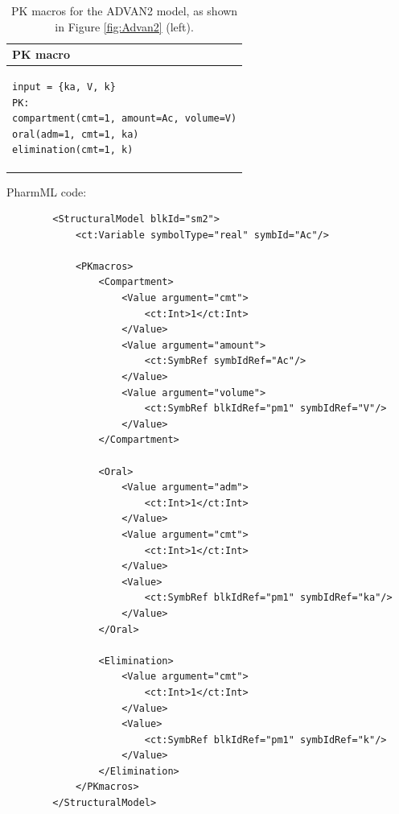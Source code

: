 \begin{table}[h!]
\setlength{\tabcolsep}{15pt}
\begin{center}
\begin{tabular}{l}
  \hline \hline
PK macro  \\[-.25ex]
  \hline
\lstset{language=NONMEMdataSet}
\begin{lstlisting}
input = {ka, V, k}
PK:
compartment(cmt=1, amount=Ac, volume=V)
oral(adm=1, cmt=1, ka)
elimination(cmt=1, k)
\end{lstlisting}
\\
  \hline
\end{tabular}
\caption{PK macros  for the ADVAN2 model, as shown in Figure \ref{fig:Advan2} (left).}
\label{tab:advan2Table}
\end{center}
\end{table}

PharmML code:
\lstset{language=XML}
\begin{lstlisting}
        <StructuralModel blkId="sm2">
            <ct:Variable symbolType="real" symbId="Ac"/>
            
            <PKmacros>
                <Compartment>
                    <Value argument="cmt">
                        <ct:Int>1</ct:Int>
                    </Value>
                    <Value argument="amount">
                        <ct:SymbRef symbIdRef="Ac"/>
                    </Value>
                    <Value argument="volume">
                        <ct:SymbRef blkIdRef="pm1" symbIdRef="V"/>
                    </Value>
                </Compartment>
                
                <Oral>
                    <Value argument="adm">
                        <ct:Int>1</ct:Int>
                    </Value>
                    <Value argument="cmt">
                        <ct:Int>1</ct:Int>
                    </Value>
                    <Value>
                        <ct:SymbRef blkIdRef="pm1" symbIdRef="ka"/>
                    </Value>
                </Oral>
                
                <Elimination>
                    <Value argument="cmt">
                        <ct:Int>1</ct:Int>
                    </Value>
                    <Value>
                        <ct:SymbRef blkIdRef="pm1" symbIdRef="k"/>
                    </Value>
                </Elimination>
            </PKmacros>
        </StructuralModel>
\end{lstlisting}


